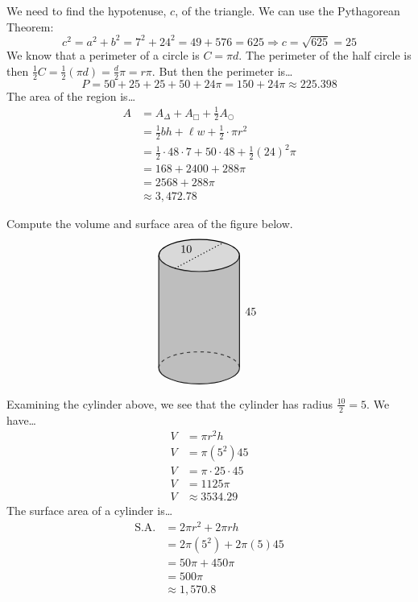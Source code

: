 \documentclass[12pt,letterpaper]{exam}
\begin{document}
\begin{questions}
We need to find the hypotenuse, $c$, of the triangle. We can use the Pythagorean Theorem:
	\[
	c^2= a^2 + b^2= 7^2 + 24^2= 49 + 576= 625 \Longrightarrow c= \sqrt{625}= 25
	\]
We know that a perimeter of a circle is $C= \pi d$. The perimeter of the half circle is then $\frac{1}{2}C= \frac{1}{2} (\pi d)= \frac{d}{2} \pi= r \pi$. But then the perimeter is\dots
	\[
	P= 50 + 25 + 25 + 50 + 24\pi= 150 + 24\pi \approx 225.398
	\]
The area of the region is\dots
	\[
	\begin{aligned}
	A&= A_{\Delta} + A_{\Box} + \frac{1}{2} A_{\bigcirc} \\[0.3cm]
	&= \frac{1}{2} bh + \ell w + \frac{1}{2} \cdot \pi r^2 \\[0.3cm]
	&= \frac{1}{2} \cdot 48 \cdot 7 + 50 \cdot 48 + \frac{1}{2} (24)^2 \pi \\[0.3cm]
	&= 168 + 2400 + 288\pi \\[0.3cm]
	&= 2568 + 288\pi \\[0.3cm]
	&\approx 3,\!472.78
	\end{aligned}
	\]



\newpage
\question[5] Compute the volume and surface area of the figure below. 
	\[
	\begin{tikzpicture}
	\draw[line width= 0.03cm,fill=gray!30] (0,3.5) ellipse (1.25 and 0.5);	%
	\draw[line width= 0.03cm] (-1.25,3.5) -- (-1.25,0); %
	\draw[line width= 0.03cm] (1.25,0) -- (1.25,3.5);  %
	\draw[line width= 0.03cm] (-1.25,0) arc (180:360:1.25 and 0.5); %
	\draw[line width= 0.03cm, dashed] (-1.25,0) arc (180:360:1.25 and -0.5); %
	\fill[gray,opacity=0.5] (-1.25,3.5) -- (-1.25,0) arc (180:360:1.25 and 0.5) -- (1.25,3.5) arc (0:180:1.25 and -0.5); %
	
	\draw[line width= 0.03cm,dotted] (-0.75,3.1) -- (0.75,3.9); %
	
	\node at (-0.4,3.7) {10};
	\node at (1.6,1.75) {45};
	\end{tikzpicture}
	\] \pspace

\sol Examining the cylinder above, we see that the cylinder has radius $\frac{10}{2}= 5$. We have\dots
	\[
	\begin{aligned}
	V&= \pi r^2 h \\[0.3cm] 
	V&= \pi (5^2) 45 \\[0.3cm]
	V&= \pi \cdot 25 \cdot 45 \\[0.3cm]
	V&= 1125 \pi \\[0.3cm]
	V&\approx 3534.29
	\end{aligned}
	\] \pspace
The surface area of a cylinder is\dots \pspace
	\[
	\begin{aligned}
	\text{S.A.}&= 2\pi r^2 + 2\pi r h \\[0.3cm]
	&= 2\pi (5^2) + 2 \pi (5) 45 \\[0.3cm]
	&= 50\pi + 450\pi \\[0.3cm]
	&= 500\pi \\[0.3cm]
	&\approx 1,\!570.8
	\end{aligned}
	\]


\end{questions}
\end{document}

